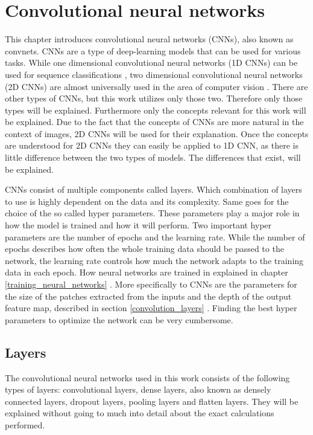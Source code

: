 


\chapter{Convolutional neural networks}
\label{convolutional_neural_networks}

This chapter introduces convolutional neural networks (CNNs), also known as convnets. CNNs are a type of deep-learning models that can be used for various tasks. While one dimensional convolutional neural networks (1D CNNs) can be used for sequence classifications , two dimensional convolutional neural networks (2D CNNs) are almost universally used in the area of computer vision . There are other types of CNNs, but this work utilizes only those two. Therefore only those types will be explained. Furthermore only the concepts relevant for this work will be explained. Due to the fact that the concepts of CNNs are more natural in the context of images, 2D CNNs will be used for their explanation. Once the concepts are understood for 2D CNNs they can easily be applied to 1D CNN, as there is little difference between the two types of models. The differences that exist, will be explained. 

CNNs consist of multiple components called layers. Which combination of layers to use is highly dependent on the data and its complexity. Same goes for the choice of the so called hyper parameters. These parameters play a major role in how the model is trained and how it will perform. Two important hyper parameters are the number of epochs and the learning rate. While the number of epochs describes how often the whole training data should be passed to the network, the learning rate controls how much the network adapts to the training data in each epoch. How neural networks are trained in explained in chapter \ref{training_neural_networks} . More specifically to CNNs are the parameters for the size of the patches extracted from the inputs and the depth of the output feature map, described in section \ref{convolution_layers} . Finding the best hyper parameters to optimize the network can be very cumbersome. 

\newpage

\section{Layers}
\label{layers}
The convolutional neural networks used in this work consists of the following types of layers: convolutional layers, dense layers, also known as densely connected layers, dropout layers, pooling layers and flatten layers. They will be explained without going to much into detail about the exact calculations performed.

